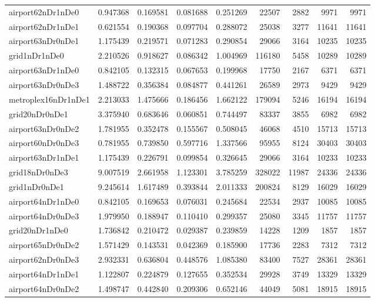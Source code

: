 \begin{longtable}{|l|r|r|r|r|r|r|r|r|}
airport62nDr1nDe0 & 0.947368 & 0.169581 & 0.081688 & 0.251269 & 22507 & 2882 & 9971 & 9971 \\
airport62nDr1nDe1 & 0.621554 & 0.190368 & 0.097704 & 0.288072 & 25038 & 3277 & 11641 & 11641 \\
airport63nDr0nDe1 & 1.175439 & 0.219571 & 0.071283 & 0.290854 & 29066 & 3164 & 10235 & 10235 \\
grid1nDr1nDe0 & 2.210526 & 0.918627 & 0.086342 & 1.004969 & 116180 & 5458 & 10289 & 10289 \\
airport63nDr1nDe0 & 0.842105 & 0.132315 & 0.067653 & 0.199968 & 17750 & 2167 & 6371 & 6371 \\
airport63nDr0nDe3 & 1.488722 & 0.356384 & 0.084877 & 0.441261 & 26589 & 2973 & 9429 & 9429 \\
metroplex16nDr1nDe1 & 2.213033 & 1.475666 & 0.186456 & 1.662122 & 179094 & 5246 & 16194 & 16194 \\
grid20nDr0nDe1 & 3.375940 & 0.683646 & 0.060851 & 0.744497 & 83337 & 3855 & 6982 & 6982 \\
airport63nDr0nDe2 & 1.781955 & 0.352478 & 0.155567 & 0.508045 & 46068 & 4510 & 15713 & 15713 \\
airport60nDr0nDe3 & 0.781955 & 0.739850 & 0.597716 & 1.337566 & 95955 & 8124 & 30403 & 30403 \\
airport63nDr1nDe1 & 1.175439 & 0.226791 & 0.099854 & 0.326645 & 29066 & 3164 & 10233 & 10233 \\
grid18nDr0nDe3 & 9.007519 & 2.661958 & 1.123301 & 3.785259 & 328022 & 11987 & 24336 & 24336 \\
grid1nDr0nDe1 & 9.245614 & 1.617489 & 0.393844 & 2.011333 & 200824 & 8129 & 16029 & 16029 \\
airport64nDr1nDe0 & 0.842105 & 0.169653 & 0.076031 & 0.245684 & 22534 & 2937 & 10085 & 10085 \\
airport64nDr0nDe3 & 1.979950 & 0.188947 & 0.110410 & 0.299357 & 25080 & 3345 & 11757 & 11757 \\
grid20nDr1nDe0 & 1.736842 & 0.210472 & 0.029387 & 0.239859 & 14228 & 1209 & 1857 & 1857 \\
airport65nDr0nDe2 & 1.571429 & 0.143531 & 0.042369 & 0.185900 & 17736 & 2283 & 7312 & 7312 \\
airport62nDr0nDe3 & 2.932331 & 0.636804 & 0.448576 & 1.085380 & 83400 & 7527 & 28361 & 28361 \\
airport64nDr1nDe1 & 1.122807 & 0.224879 & 0.127655 & 0.352534 & 29928 & 3749 & 13329 & 13329 \\
airport64nDr0nDe2 & 1.498747 & 0.442840 & 0.209306 & 0.652146 & 44049 & 5081 & 18915 & 18915 \\

\end{longtable}
